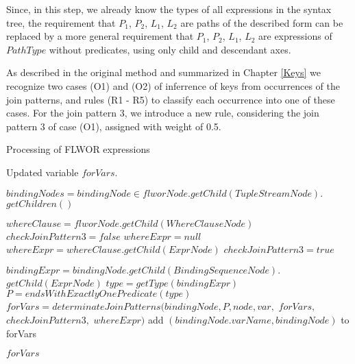 Since, in this step, we already know the types of all expressions in the syntax tree, the requirement that $P_1$, $P_2$, $L_1$, $L_2$ are paths of the described form can be replaced by a more general requirement that $P_1$, $P_2$, $L_1$, $L_2$ are expressions of $PathType$ without predicates, using only child and descendant axes.

As described in the original method and summarized in Chapter \ref{Keys} we recognize two cases (O1) and (O2) of inferrence of keys from occurrences of the join patterns, and rules (R1 - R5) to classify each occurrence into one of these cases. For the join pattern 3, we introduce a new rule, considering the join pattern 3 of case (O1), assigned with weight of 0.5. 

\begin{algorithm}
\caption{Processing of FLWOR expressions}
\label{ALG_processing_of_flwor_expressions}
\begin{algorithmic}[1]

\ENSURE Updated variable $forVars$.

\STATE $bindingNodes = bindingNode \in flworNode.getChild(TupleStreamNode).$ $getChildren()$

\STATE $whereClause = flworNode.getChild(WhereClauseNode)$
\STATE $checkJoinPattern3 = false$
\STATE $whereExpr = null$
    \STATE $whereExpr = whereClause.getChild(ExprNode)$
        \STATE $checkJoinPattern3 = true$
    \ENDIF
\ENDIF

    \STATE $bindingExpr = bindingNode.getChild(BindingSequenceNode).$ $getChild(ExprNode)$
    \STATE $type = getType(bindingExpr)$
    	\STATE $P = endsWithExactlyOnePredicate(type)$
            	\STATE $forVars = determinateJoinPatterns(bindingNode, P, node, var,$ $forVars,$ $checkJoinPattern3,$ $whereExpr)$
        	\ENDFOR
            	\STATE add $(bindingNode.varName, bindingNode)$ to forVars
        	\ENDIF
        \ENDIF
    \ENDIF
\ENDFOR

\RETURN $forVars$
\end{algorithmic}
\end{algorithm}

